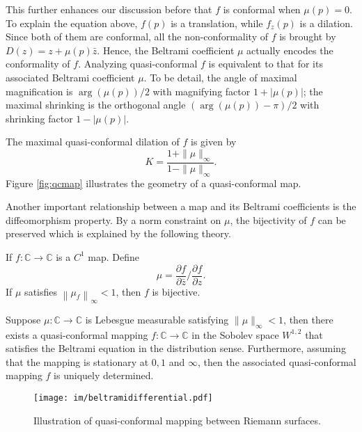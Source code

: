This further enhances our discussion before that $f$ is conformal when $\mu(p) = 0$. To explain the equation above, $f(p)$ is a translation, while $f_z(p)$ is a dilation. Since both of them are conformal, all the non-conformality of $f$ is brought by $D(z)=z+\mu(p) \bar{z}$. Hence, the Beltrami coefficient $\mu$ actually encodes the conformality of $f$. Analyzing quasi-conformal $f$ is equivalent to that for its associated Beltrami coefficient $\mu$. To be detail, the angle of maximal magnification is $\arg (\mu(p)) / 2$ with magnifying factor $1 + |\mu(p)|$; the maximal shrinking is the orthogonal angle $(\arg (\mu(p))-\pi) / 2$ with shrinking factor $1 - |\mu(p)|$. 

The maximal quasi-conformal dilation of $f$ is given by
\begin{equation}
K=\frac{1+\|\mu\|_{\infty}}{1-\|\mu\|_{\infty}}.
\end{equation}
Figure \ref{fig:qcmap} illustrates the geometry of a quasi-conformal map.

Another important relationship between a map and its Beltrami coefficients is the diffeomorphism property. By a norm constraint on $\mu$, the bijectivity of $f$ can be preserved which is explained by the following theory.

\begin{theorem}
If $f: \mathbb{C} \rightarrow \mathbb{C}$ is a $C^{1}$ map. Define 
\begin{equation}
\mu=\frac{\partial f}{\partial \bar{z}} / \frac{\partial f}{\partial z}.
\end{equation}
If $\mu$ satisfies $\left\|\mu_{f}\right\|_{\infty}<1$, then $f$ is bijective.
\end{theorem}

\begin{theorem}
\label{them:RiemannMapping}
Suppose $\mu: \mathbb{C}\rightarrow\mathbb{C}$ is Lebesgue measurable satisfying $\|\mu\|_{\infty}<1$, then there exists a quasi-conformal mapping $f:\mathbb{C}\rightarrow \mathbb{C}$ in the Sobolev space $W^{1,2}$ that satisfies the Beltrami equation in the distribution sense. Furthermore, assuming that the mapping is stationary at $0, 1$ and $\infty$, then the associated quasi-conformal mapping $f$ is uniquely determined.
\end{theorem}

\begin{figure}
    \centering
    \texttt{[image: im/beltramidifferential.pdf]}
    \caption{Illustration of quasi-conformal mapping between Riemann surfaces.}
    \label{fig:bcdifferential}
\end{figure}


